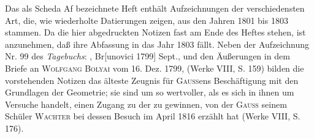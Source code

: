 \clearpage{}
\begingroup\small
\newcommand{\GeomAngle}{\mathord{\vcenter{\hbox{\begin{tikzpicture}[x=.75em,y=.75em,line width=.35pt]\draw (0,.35)--(.9,.65);\draw (0,.35)--(.9,.05);\draw (.15,.8)..controls (.6,.65) and (.6,.05)..(.15,-.1);\end{tikzpicture}}}}}
\indent Das als Scheda Af bezeichnete Heft enthält Aufzeichnungen der verschiedensten Art, die, wie wiederholte Datierungen zeigen, aus den Jahren 1801 bis 1803 stammen. Da die hier abgedruckten Notizen fast am Ende des Heftes stehen, ist anzunehmen, daß ihre Abfassung in das Jahr 1803 fällt. Neben der Aufzeichnung Nr. 99 des \textit{Tagebuchs}: , Br[unovici 1799] Sept., und den Äußerungen in dem Briefe an \textsc{Wolfgang Bolyai} vom 16. Dez. 1799, (Werke VIII, S. 159) bilden die vorstehenden Notizen das älteste Zeugnis für \textsc{Gauss}ens Beschäftigung mit den Grundlagen der Geometrie; sie sind um so wertvoller, als es sich in ihnen um Versuche handelt, einen Zugang zu der  zu gewinnen, von der \textsc{Gauss} seinem Schüler \textsc{Wachter} bei dessen Besuch im April 1816 erzählt hat (Werke VIII, S. 176).

